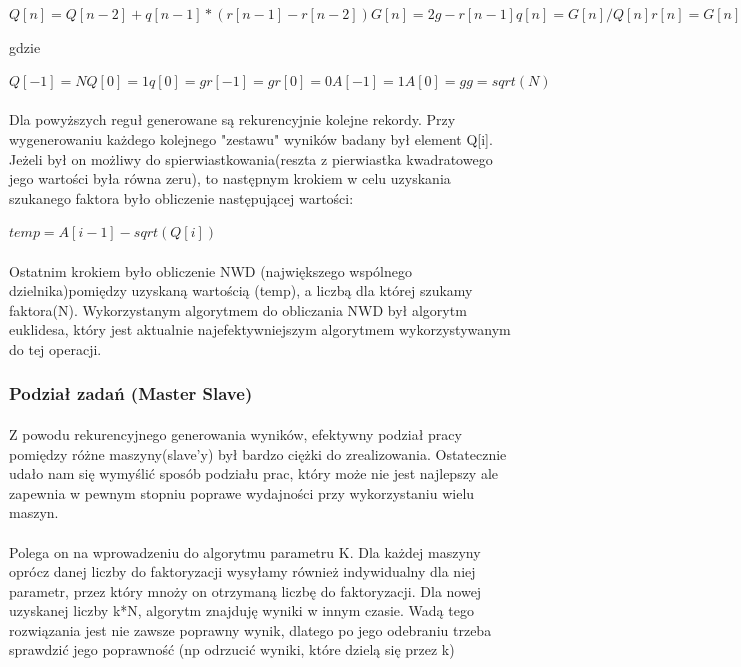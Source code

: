 \documentclass{article}
\begin{document}
$Q[n] = Q[n-2] + q[n-1] * (r[n-1] - r[n-2]) G[n] = 2g - r[n-1] q[n] = G[n]/Q[n] r[n] = G[n] - q[n]Q[n] A[n] = q[n]*A[n-1] + A[n-2]modN$

gdzie

$Q[-1]= N Q[0] = 1 q[0] = g r[-1] = g r[0] = 0 A[-1]= 1 A[0] = g g = sqrt(N)$
\paragraph{}Dla powyższych reguł generowane są rekurencyjnie kolejne rekordy. Przy wygenerowaniu każdego kolejnego "zestawu" wyników badany był element Q[i]. Jeżeli był on możliwy do spierwiastkowania(reszta z pierwiastka kwadratowego jego wartości była równa zeru), to następnym krokiem w celu uzyskania szukanego faktora było obliczenie następującej wartości:

$temp = A[i-1] - sqrt(Q[i])$

\paragraph{}Ostatnim krokiem było obliczenie NWD (największego wspólnego dzielnika)pomiędzy uzyskaną wartością (temp), a liczbą dla której szukamy faktora(N). Wykorzystanym algorytmem do obliczania NWD był algorytm euklidesa, który jest aktualnie najefektywniejszym algorytmem wykorzystywanym do tej operacji.

\subsubsection{Podział zadań (Master Slave)}

\paragraph{}Z powodu rekurencyjnego generowania wyników, efektywny podział pracy pomiędzy różne maszyny(slave'y) był bardzo ciężki do zrealizowania. Ostatecznie udało nam się wymyślić sposób podziału prac, który może nie jest najlepszy ale zapewnia w pewnym stopniu poprawe wydajności przy wykorzystaniu wielu maszyn.

\paragraph{}Polega on na wprowadzeniu do algorytmu parametru K. Dla każdej maszyny oprócz danej liczby do faktoryzacji wysyłamy również indywidualny dla niej parametr, przez który mnoży on otrzymaną liczbę do faktoryzacji. Dla nowej uzyskanej liczby k*N, algorytm znajduję wyniki w innym czasie. Wadą tego rozwiązania jest nie zawsze poprawny wynik, dlatego po jego odebraniu trzeba sprawdzić jego poprawność (np odrzucić wyniki, które dzielą się przez k)
\end{document}

